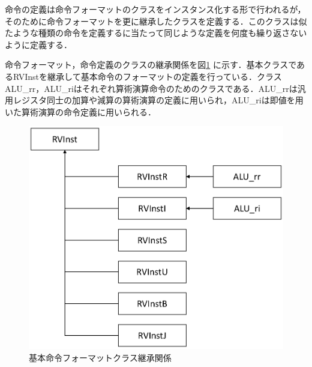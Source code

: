 命令の定義は命令フォーマットのクラスをインスタンス化する形で行われるが，そのために命令フォーマットを更に継承したクラスを定義する．このクラスは似たような種類の命令を定義するに当たって同じような定義を何度も繰り返さないように定義する．

命令フォーマット，命令定義のクラスの継承関係を図\ref{fig:InstFromat_class}%
に示す．基本クラスであるRVInstを継承して基本命令のフォーマットの定義を行っている．クラスALU\_rr，ALU\_riはそれぞれ算術演算命令のためのクラスである．ALU\_rrは汎用レジスタ同士の加算や減算の算術演算の定義に用いられ，ALU\_riは即値を用いた算術演算の命令定義に用いられる．

\begin{figure}[tb]
    \centering
    \includegraphics[scale=0.5]{image/InstFormat_class.pdf}
    \caption{基本命令フォーマットクラス継承関係}
    \label{fig:InstFromat_class}
\end{figure}